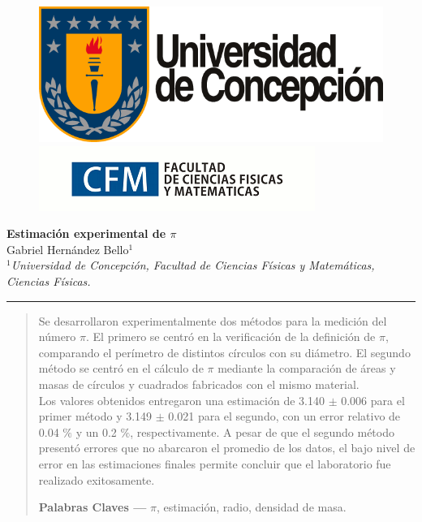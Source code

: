 \documentclass[10pt,a4paper]{article}
\author{Gabriel Hernandez Bello}
\begin{document}
	
	\begin{figure}[H]
		\raggedright
		\includegraphics[scale=0.2]{../Altura-Campanil/IMG/logo_udec.png} \hfill \includegraphics[scale=0.5]{../Altura-Campanil/IMG/cfm_logo.png}
	\end{figure}

	\vspace{6mm}
	\begin{center}
		{\Large \textbf{Estimación experimental de \textbf{$\pi$}}}\\
		\vspace{2mm}
		{\large Gabriel Hernández Bello$^{1}$}\\
		\vspace{6.5mm}
		$^1$\textit{Universidad de Concepción, Facultad de Ciencias Físicas y Matemáticas, Ciencias Físicas. }\\
	\end{center}

	\begin{center}
		\textcolor{pinegreen}{\rule{150mm}{0.8mm}}
	\end{center}

	\begin{abstract}
	Se desarrollaron experimentalmente dos métodos para la medición del número $\pi$. El primero se centró en la verificación de la definición de $\pi$, comparando el perímetro de distintos círculos con su diámetro. El segundo método se centró en el cálculo de $\pi$ mediante la comparación de áreas y masas de círculos y cuadrados fabricados con el mismo material.\\
	
	Los valores obtenidos entregaron una estimación de 3.140 $\pm$ 0.006 para el primer método y 3.149 $\pm$ 0.021 para el segundo, con un error relativo de 0.04 $\%$ y un 0.2 $\%$, respectivamente. A pesar de que el segundo método presentó errores que no abarcaron el promedio de los datos, el bajo nivel de error en las estimaciones finales permite concluir que el laboratorio fue realizado exitosamente.

		\textbf{Palabras Claves ---}  $\pi$, estimación, radio, densidad de masa.
	\end{abstract}
	
\end{document}
